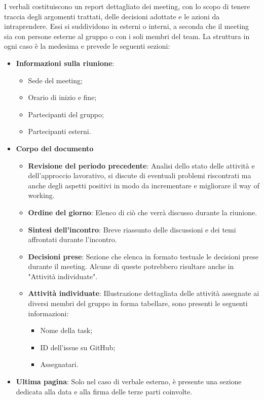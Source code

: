 I verbali costituiscono un report dettagliato dei meeting, con lo scopo di tenere traccia degli argomenti trattati, delle decisioni adottate e le
azioni da intraprendere. Essi si suddividono in esterni o interni, a seconda che il meeting sia con persone esterne al gruppo o con i soli membri del team.
La struttura in ogni caso è la medesima e prevede le seguenti sezioni:
\begin{itemize}
	\item \textbf{Informazioni sulla riunione}:
	      \begin{itemize}
		      \item Sede del meeting;
		      \item Orario di inizio e fine;
		      \item Partecipanti del gruppo;
		      \item Partecipanti esterni.
	      \end{itemize}
	\item \textbf{Corpo del documento}
	      \begin{itemize}
		      \item \textbf{Revisione del periodo precedente}:
		            Analisi dello stato delle attività e dell'approccio lavorativo, si discute di eventuali problemi riscontrati
		            ma anche degli aspetti positivi in modo da incrementare e migliorare il way of working.
		      \item \textbf{Ordine del giorno}:
		            Elenco di ciò che verrà discusso durante la riunione.
		      \item \textbf{Sintesi dell'incontro}:
		            Breve riassunto delle discussioni e dei temi affrontati durante l'incontro.
		      \item \textbf{Decisioni prese}:
		            Sezione che elenca in formato testuale le decisioni prese durante il meeting. Alcune di queste potrebbero risultare anche in "Attività individuate".
		      \item \textbf{Attività individuate}:
		            Illustrazione dettagliata delle attività assegnate ai diversi membri del gruppo in forma tabellare, sono presenti le seguenti informazioni:
		            \begin{itemize}
			            \item Nome della task;
			            \item ID dell'issue su GitHub;
			            \item Assegnatari.
		            \end{itemize}
	      \end{itemize}
	\item \textbf{Ultima pagina}:
	      Solo nel caso di verbale esterno, è presente una sezione dedicata alla data e alla firma delle terze parti coinvolte.
\end{itemize}

